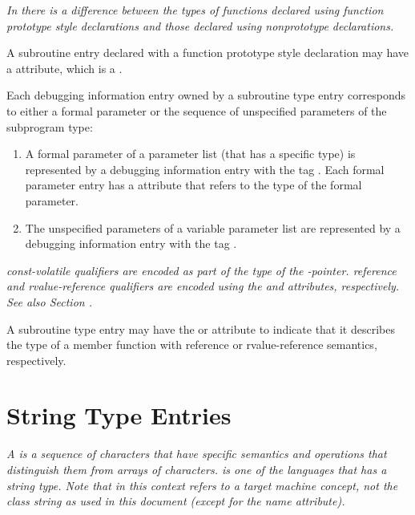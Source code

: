 \textit{In  there 
is a difference between the types of functions
declared using function prototype style declarations and
those declared using non\dash prototype declarations.}

A 
\hypertarget{chap:DWATprototypedsubroutineprototype}{}
subroutine entry declared with a function prototype style
declaration may have 
a 
\DWATprototyped{} attribute, which is
a .

Each debugging information entry owned by a subroutine
type entry corresponds to either a formal parameter or the sequence of
unspecified parameters of the subprogram type:

\begin{enumerate}[1. ]
\item A formal parameter of a parameter list (that has a
specific type) is represented by a debugging information entry
with the tag \DWTAGformalparameter. 
Each formal parameter
entry has 
a \DWATtype{} attribute that refers to the type of
the formal parameter.

\item The unspecified parameters of a variable parameter list
are 
represented by a debugging information entry with the
tag \DWTAGunspecifiedparameters.
\end{enumerate}

\textit{ const-volatile qualifiers are encoded as 
part of the type of the
-pointer. 
 reference and rvalue-reference qualifiers are encoded using
the \DWATreference{} and \DWATrvaluereference{} attributes, respectively. 
See also Section .}

A subroutine type entry may have the \DWATreference{} or
\DWATrvaluereference{} attribute to indicate that it describes the
type of a member function with reference or rvalue-reference 
semantics, respectively.


\section{String Type Entries}
\label{chap:stringtypeentries}

\textit{A  is a sequence of characters that have specific
semantics and operations that distinguish them from arrays of
characters. 
 is one of the languages that has a string
type. Note that  in this context refers to a target
machine concept, not the class string as used in this document
(except for the name attribute).}

